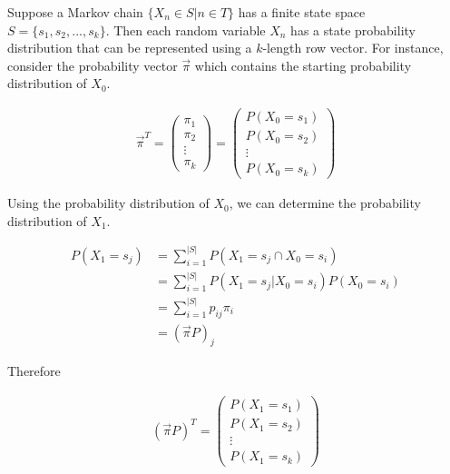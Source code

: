 \documentclass[a4paper, 12pt]{article}
\begin{document}
Suppose a Markov chain $\{X_n \in S|n \in T\}$ has a finite state space $S = \{s_1, s_2,..., s_k\}$. Then each random 
variable $X_n$ has a state probability distribution that can be represented using a $k$-length row vector. For instance, 
consider the probability vector $\vec{\pi}$ which contains the starting probability distribution of $X_0$.
	
	\begin{equation*}
	\begin{aligned}
		\vec{\pi}^T = \begin{pmatrix}
		 \pi_1 \\
		 \pi_2 \\ 
		 \vdots \\
		 \pi_k
		 \end{pmatrix} = \begin{pmatrix}
		 P(X_0 = s_1) \\
		 P(X_0 = s_2) \\ 
		 \vdots \\
		 P(X_0 = s_k)
		 \end{pmatrix}
	\end{aligned}
	\end{equation*}		
	
Using the probability distribution of $X_0$, we can determine the probability distribution of $X_1$.

	\begin{equation*}
	\begin{aligned}
		P(X_1 = s_j) &= \sum_{i=1}^{|S|} P(X_1 = s_j \cap X_0 = s_i) \\
				 	 &= \sum_{i=1}^{|S|} P(X_1 = s_j | X_0 = s_i)P(X_0 = s_i) \\
			     	 &= \sum_{i=1}^{|S|} p_{ij}\pi_i \\
			     	 &= (\vec{\pi}P)_j
	\end{aligned}
	\end{equation*}	
			     	 
	Therefore
	
	\begin{equation*}
	\begin{aligned}
		 (\vec{\pi}P)^T =
		 \begin{pmatrix}
		 P(X_1 = s_1) \\
		 P(X_1 = s_2) \\ 
		 \vdots \\
		 P(X_1 = s_k)
		 \end{pmatrix}
	\end{aligned}
	\end{equation*}
	
\end{document}

